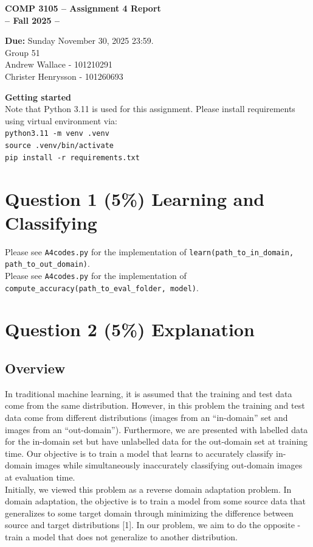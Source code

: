 \documentclass[12pt]{article}
\begin{document}
 

\begin{center} \Large\bf
COMP 3105 -- Assignment 4 Report\\
-- Fall 2025 -- 
\end{center} 

\begin{center}
{\bf Due:} Sunday November 30, 2025 23:59. \\
Group 51 \\
Andrew Wallace - 101210291\\
Christer Henrysson - 101260693\\[1em]
\end{center}
\textbf{Getting started} \\
Note that Python 3.11 is used for this assignment. Please install requirements using virtual environment via: \\
  \texttt{python3.11 -m venv .venv} \\
  \texttt{source .venv/bin/activate} \\
  \texttt{pip install -r requirements.txt}
\vspace{0.5em}
\newpage 

\section*{Question 1 (5\%) Learning and Classifying}
Please see \texttt{A4codes.py} for the implementation of \texttt{learn(path\_to\_in\_domain, path\_to\_out\_domain)}. \\[1em]
Please see \texttt{A4codes.py} for the implementation of \texttt{compute\_accuracy(path\_to\_eval\_folder, model)}. \\

\section*{Question 2 (5\%) Explanation} 
\subsection*{Overview}
In traditional machine learning, it is assumed that the training and test data come from the same distribution. However, in this problem the training and test data come from different distributions (images from an ``in-domain'' set and images from an ``out-domain''). Furthermore, we are presented with labelled data for the in-domain set but have unlabelled data for the out-domain set at training time. Our objective is to train a model that learns to accurately classify in-domain images while simultaneously inaccurately classifying out-domain images at evaluation time. \\[1em]
Initially, we viewed this problem as a reverse domain adaptation problem. In domain adaptation, the objective is to train a model from some source data that generalizes to some target domain through minimizing the difference between source and target distributions [1]. In our problem, we aim to do the opposite - train a model that does not generalize to another distribution. 
\end{document}
